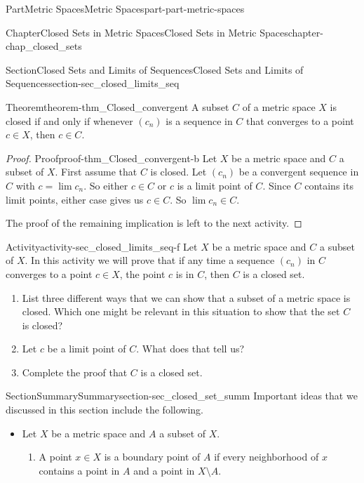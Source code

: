 \documentclass[oneside,10pt,]{book}
\numberwithin{equation}{chapter}
\begin{document}
\begin{partptx}{Part}{Metric Spaces}{}{Metric Spaces}{}{}{part-part-metric-spaces}
\begin{chapterptx}{Chapter}{Closed Sets in Metric Spaces}{}{Closed Sets in Metric Spaces}{}{}{chapter-chap_closed_sets}
\begin{sectionptx}{Section}{Closed Sets and Limits of Sequences}{}{Closed Sets and Limits of Sequences}{}{}{section-sec_closed_limits_seq}
\begin{theorem}{Theorem}{}{}{theorem-thm_Closed_convergent}%
A subset \(C\) of a metric space \(X\) is closed if and only if whenever \((c_n)\) is a sequence in \(C\) that converges to a point \(c \in X\), then \(c \in C\).%
\end{theorem}
\begin{proof}{Proof}{}{proof-thm_Closed_convergent-b}
Let \(X\) be a metric space and \(C\) a subset of \(X\). First assume that \(C\) is closed. Let \((c_n)\) be a convergent sequence in \(C\) with \(c = \lim c_n\). So either \(c \in C\) or \(c\) is a limit point of \(C\). Since \(C\) contains its limit points, either case gives us \(c \in C\). So \(\lim c_n \in C\).%
\par
The proof of the remaining implication is left to the next activity.%
\end{proof}
\begin{activity}{Activity}{}{activity-sec_closed_limits_seq-f}%
Let \(X\) be a metric space and \(C\) a subset of \(X\). In this activity we will prove that if any time a sequence \((c_n)\) in \(C\) converges to a point \(c \in X\), the point \(c\) is in \(C\), then \(C\) is a closed set.%
\begin{enumerate}[font=\bfseries,label=(\alph*),ref=\alph*]%
\item{}List three different ways that we can show that a subset of a metric space is closed. Which one might be relevant in this situation to show that the set \(C\) is closed?%
\item{}Let \(c\) be a limit point of \(C\). What does that tell us?%
\item{}Complete the proof that \(C\) is a closed set.%
\end{enumerate}%
\end{activity}%
\end{sectionptx}
%
%
\typeout{************************************************}
\typeout{************************************************}
%
\begin{sectionptx}{Section}{Summary}{}{Summary}{}{}{section-sec_closed_set_summ}
Important ideas that we discussed in this section include the following.%
\begin{itemize}[label=\textbullet]
\item{}Let \(X\) be a metric space and \(A\) a subset of \(X\).%
\begin{enumerate}[label=\roman*]
\item{}A point \(x \in X\) is a boundary point of \(A\) if every neighborhood of \(x\) contains a point in \(A\) and a point in \(X \setminus A\).%

\end{enumerate}
\end{itemize}
\end{sectionptx}
\end{chapterptx}
\end{partptx}
\end{document}
